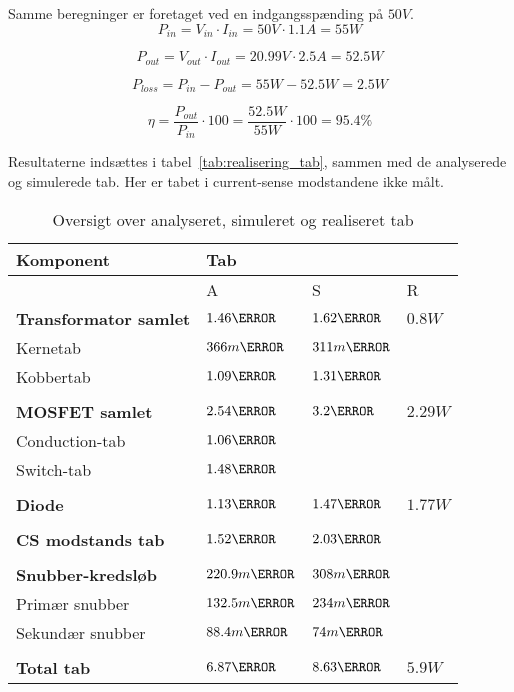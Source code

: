 \noindent Samme beregninger er foretaget ved en indgangsspænding på $50V$.
\begin{equation}
P_{in} = V_{in} \cdot I_{in} = 50V \cdot 1.1A = 55W
\end{equation}

\begin{equation}
P_{out} = V_{out} \cdot I_{out} = 20.99V \cdot 2.5A = 52.5W
\end{equation}

\begin{equation}
P_{loss} = P_{in} - P_{out} = 55W - 52.5W = 2.5W
\end{equation}

\begin{equation}
\eta = \frac{P_{out}}{P_{in}} \cdot 100 = \frac{52.5W}{55W} \cdot 100 = 95.4\percent
\end{equation}



Resultaterne indsættes i tabel~\ref{tab:realisering_tab}, sammen med de analyserede og simulerede tab. Her er tabet i current-sense modstandene ikke målt.
\begin{table}[H] 			
	\centering
	\begin{tabularx}{\textwidth}{|X|l|l|l|}
		\hline
		\textbf{\large Komponent} & \multicolumn{3}{|l|}{\textbf{\large Tab}} \\ \hline
		& A & S & R	\\ \hline
		\textbf{Transformator samlet} & $1.46\watt$ & $1.62\watt$ & $0.8W$ \\ \hline 
		Kernetab & $366m\watt$ & $311m\watt$ & \\ \hline
		Kobbertab & $1.09\watt$ & $1.31\watt$ & \\ \hline
		& &	& \\ \hline
		\textbf{MOSFET samlet} & $2.54\watt$ & $3.2\watt$ & $2.29W$ \\ \hline
		Conduction-tab & $1.06\watt$ &  &	\\ \hline
		Switch-tab & $1.48\watt$ & 	&		\\ \hline
		& &	& \\ \hline
		\textbf{Diode} & $1.13\watt$ & $1.47\watt$ & $1.77W$ \\ \hline
		& &	& \\ \hline
		\textbf{CS modstands tab} & $1.52\watt$ & $2.03\watt$ & \\ \hline
		& & &	\\ \hline
		\textbf{Snubber-kredsløb} & $220.9m\watt$ & $308m\watt$ & \\ \hline
		Primær snubber	& $132.5m\watt$	& $234m\watt$	&	\\ \hline
		Sekundær snubber &	$88.4m\watt$ &	$74m\watt$	&	\\ \hline
		& &	& \\ \hline
		\textbf{Total tab} & $6.87\watt$ & $8.63\watt$ & $5.9W$	\\ \hline
	\end{tabularx}
	\caption{Oversigt over analyseret, simuleret og realiseret tab}
	\label{tab:realisering_tab_3}
\end{table}

